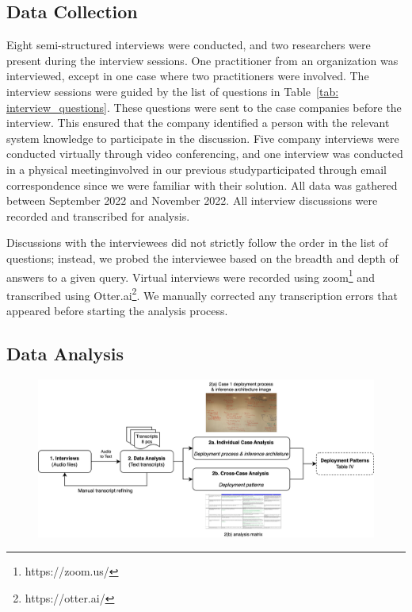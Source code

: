 \subsection{Data Collection}
Eight semi-structured interviews were conducted, and two researchers were present during the interview sessions. One practitioner from an organization was interviewed, except in one case where two practitioners were involved. The interview sessions were guided by the list of questions in Table~\ref{tab: interview_questions}. These questions were sent to the case companies before the interview. This ensured that the company identified a person with the relevant system knowledge to participate in the discussion. Five company interviews were conducted virtually through video conferencing, and one interview was conducted in a physical meeting\DIFdelbegin {}\DIFdelend \DIFaddbegin {}\DIFaddend involved in our previous study\DIFaddbegin {}\DIFaddend participated through email correspondence since we were familiar with their solution. All data was gathered between September 2022 and November 2022. All interview discussions were recorded and transcribed for analysis.

Discussions with the interviewees did not strictly follow the order in the list of questions; instead, we probed the interviewee based on the breadth and depth of answers to a given query. \DIFaddbegin {}\DIFaddend Virtual interviews were recorded using zoom\footnote{https://zoom.us/} and transcribed using Otter.ai\footnote{https://otter.ai/}. We manually corrected any transcription errors that appeared before starting the analysis process.

 
\subsection{Data Analysis}
\DIFaddbegin \begin{figure}[b]
\centering
\includegraphics[width=\linewidth]{images/data_analysis_process.png}
\caption{}
\label{fig: data analysis process}
\end{figure}


